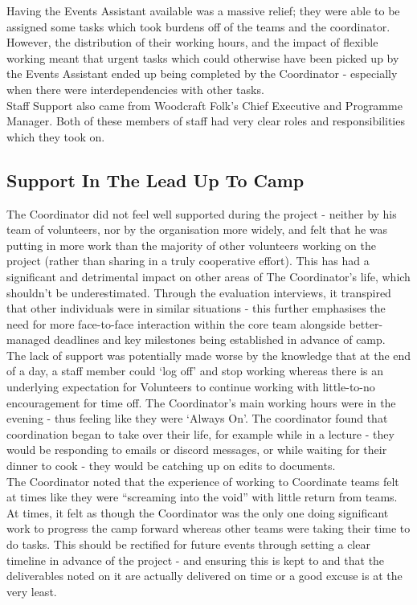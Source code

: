 Having the Events Assistant available was a massive relief; they were able to be assigned some tasks which took burdens off of the teams and the coordinator. However, the distribution of their working hours, and the impact of flexible working meant that urgent tasks which could otherwise have been picked up by the Events Assistant ended up being completed by the Coordinator - especially when there were interdependencies with other tasks. \\

Staff Support also came from Woodcraft Folk's Chief Executive and Programme Manager. Both of these members of staff had very clear roles and responsibilities which they took on.

\subsection{Support In The Lead Up To Camp}
The Coordinator did not feel well supported during the project - neither by his team of volunteers, nor by the organisation more widely, and felt that he was putting in more work than the majority of other volunteers working on the project (rather than sharing in a truly cooperative effort). This has had a significant and detrimental impact on other areas of The Coordinator's life, which shouldn't be underestimated. Through the evaluation interviews, it transpired that other individuals were in similar situations - this further emphasises the need for more face-to-face interaction within the core team alongside better-managed deadlines and key milestones being established in advance of camp.\\

The lack of support was potentially made worse by the knowledge that at the end of a day, a staff member could `log off' and stop working whereas there is an underlying expectation for Volunteers to continue working with little-to-no encouragement for time off. The Coordinator's main working hours were in the evening - thus feeling like they were `Always On'. The coordinator found that coordination began to take over their life, for example while in a lecture - they would be responding to emails or discord messages, or while waiting for their dinner to cook - they would be catching up on edits to documents. \\

The Coordinator noted that the experience of working to Coordinate teams felt at times like they were ``screaming into the void'' with little return from teams. At times, it felt as though the Coordinator was the only one doing significant work to progress the camp forward whereas other teams were taking their time to do tasks. This should be rectified for future events through setting a clear timeline in advance of the project - and ensuring this is kept to and that the deliverables noted on it are actually delivered on time or a good excuse is at the very least.\\

